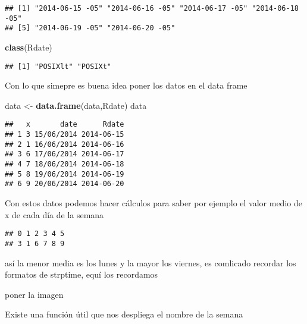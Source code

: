 \documentclass[]{article}
\newenvironment{Shaded}{\begin{snugshade}}{\end{snugshade}}
\newcommand{\KeywordTok}[1]{\textcolor[rgb]{0.13,0.29,0.53}{\textbf{#1}}}
\newcommand{\DataTypeTok}[1]{\textcolor[rgb]{0.13,0.29,0.53}{#1}}
\newcommand{\StringTok}[1]{\textcolor[rgb]{0.31,0.60,0.02}{#1}}
\newcommand{\OperatorTok}[1]{\textcolor[rgb]{0.81,0.36,0.00}{\textbf{#1}}}
\newcommand{\NormalTok}[1]{#1}
\begin{document}
\begin{verbatim}
## [1] "2014-06-15 -05" "2014-06-16 -05" "2014-06-17 -05" "2014-06-18 -05"
## [5] "2014-06-19 -05" "2014-06-20 -05"
\end{verbatim}

\begin{Shaded}
\begin{Highlighting}[]
\KeywordTok{class}\NormalTok{(Rdate)}
\end{Highlighting}
\end{Shaded}

\begin{verbatim}
## [1] "POSIXlt" "POSIXt"
\end{verbatim}

Con lo que simepre es buena idea poner los datos en el data frame

\begin{Shaded}
\begin{Highlighting}[]
\NormalTok{data <-}\StringTok{ }\KeywordTok{data.frame}\NormalTok{(data,Rdate)}
\NormalTok{data}
\end{Highlighting}
\end{Shaded}

\begin{verbatim}
##   x       date      Rdate
## 1 3 15/06/2014 2014-06-15
## 2 1 16/06/2014 2014-06-16
## 3 6 17/06/2014 2014-06-17
## 4 7 18/06/2014 2014-06-18
## 5 8 19/06/2014 2014-06-19
## 6 9 20/06/2014 2014-06-20
\end{verbatim}

Con estos datos podemos hacer cálculos para saber por ejemplo el valor
medio de x de cada día de la semana

\begin{Shaded}
\end{Shaded}

\begin{verbatim}
## 0 1 2 3 4 5 
## 3 1 6 7 8 9
\end{verbatim}

así la menor media es los lunes y la mayor los viernes, es comlicado
recordar los formatos de strptime, equí los recordamos

poner la imagen

Existe una función útil que nos despliega el nombre de la semana

\begin{Shaded}
\end{Shaded}
\end{document}
